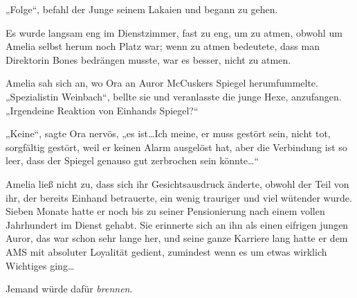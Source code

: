 „Folge“, befahl der Junge seinem Lakaien und begann zu gehen.

\later

Es wurde langsam eng im Dienstzimmer, fast zu eng, um zu atmen, obwohl um Amelia selbst herum noch Platz war; wenn zu atmen bedeutete, dass man Direktorin Bones bedrängen musste, war es besser, nicht zu atmen.

Amelia sah sich an, wo Ora an Auror McCuskers Spiegel herumfummelte.
„Spezialistin Weinbach“, bellte sie und veranlasste die junge Hexe, anzufangen.
„Irgendeine Reaktion von Einhands Spiegel?“

„Keine“, sagte Ora nervös, „es ist…Ich meine, er muss gestört sein, nicht tot, sorgfältig gestört, weil er keinen Alarm ausgelöst hat, aber die Verbindung ist so leer, dass der Spiegel genauso gut zerbrochen sein könnte…“

Amelia ließ nicht zu, dass sich ihr Gesichtsausdruck änderte, obwohl der Teil von ihr, der bereits Einhand betrauerte, ein wenig trauriger und viel wütender wurde. Sieben Monate hatte er noch bis zu seiner Pensionierung nach einem vollen Jahrhundert im Dienst gehabt. Sie erinnerte sich an ihn als einen eifrigen jungen Auror, das war schon sehr lange her, und seine ganze Karriere lang hatte er dem AMS mit absoluter Loyalität gedient, zumindest wenn es um etwas wirklich Wichtiges ging…

Jemand würde dafür \emph{brennen}.

